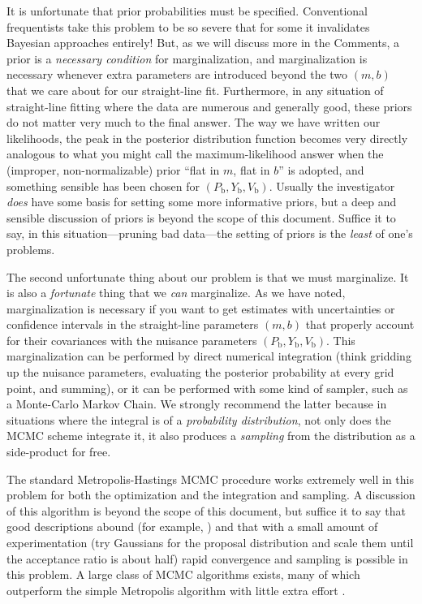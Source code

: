 \documentclass[12pt,twoside]{article}
\newcommand{\notenglish}[1]{\textsl{#1}}
\newcommand{\eg}{\notenglish{e.g.}}
\newcommand{\documentname}{document}
\newcommand{\commentsname}{Comments}
\newcounter{problem}
\newcommand{\Pbad}{P_{\mathrm{b}}}
\newcommand{\Ybad}{Y_{\mathrm{b}}}
\newcommand{\Vbad}{V_{\mathrm{b}}}
\begin{document}
It is unfortunate that prior probabilities must be specified.
Conventional frequentists take this problem to be so severe that for
some it invalidates Bayesian approaches entirely!  But, as we will
discuss more in the \commentsname, a prior is a \emph{necessary
  condition} for marginalization, and marginalization is necessary
whenever extra parameters are introduced beyond the two $(m,b)$ that
we care about for our straight-line fit.  Furthermore, in any
situation of straight-line fitting where the data are numerous and
generally good, these priors do not matter very much to the final
answer.  The way we have written our likelihoods, the peak in the
posterior distribution function becomes very directly analogous to
what you might call the maximum-likelihood answer when the (improper,
non-normalizable) prior ``flat in $m$, flat in $b$'' is adopted, and
something sensible has been chosen for $(\Pbad,\Ybad,\Vbad)$.  Usually
the investigator \emph{does} have some basis for setting some more
informative priors, but a deep and sensible discussion of priors is
beyond the scope of this \documentname.  Suffice it to say, in this
situation---pruning bad data---the setting of priors is the
\emph{least} of one's problems.

The second unfortunate thing about our problem is that we must
marginalize.  It is also a \emph{fortunate} thing that we \emph{can}
marginalize.  As we have noted, marginalization is necessary if you
want to get estimates with uncertainties or confidence intervals in
the straight-line parameters $(m,b)$ that properly account for their
covariances with the nuisance parameters $(\Pbad,\Ybad,\Vbad)$.  This
marginalization can be performed by direct numerical integration
(think gridding up the nuisance parameters, evaluating the posterior
probability at every grid point, and summing), or it can be performed
with some kind of sampler, such as a Monte-Carlo Markov Chain.  We
strongly recommend the latter because in situations where the integral
is of a \emph{probability distribution}, not only does the MCMC scheme
integrate it, it also produces a \emph{sampling} from the distribution
as a side-product for free.

The standard Metropolis-Hastings MCMC procedure works extremely well
in this problem for both the optimization and the integration and
sampling.  A discussion of this algorithm is beyond the scope of this
document, but suffice it to say that good descriptions abound (for
example, \citealt{press}) and that with a small amount of
experimentation (try Gaussians for the proposal distribution and scale
them until the acceptance ratio is about half) rapid convergence and
sampling is possible in this problem. A large class of MCMC algorithms
exists, many of which outperform the simple Metropolis algorithm with
little extra effort \citep[see, \eg,][]{gilksmcmc,neal2003a,mackay}.
\end{document}
